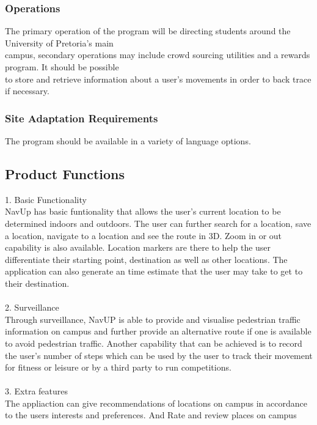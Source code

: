 \documentclass[a4paper,10pt]{article}
\begin{document}
		\subsubsection{Operations}
			The primary operation of the program will be directing students around the University of Pretoria’s main\\				campus, secondary operations may include crowd sourcing utilities and a rewards program. It should be possible\\			to store and retrieve information about a user’s movements in order to back trace if necessary.\\
		\subsubsection{Site Adaptation Requirements}
			The program should be available in a variety of language options.\\
		
		
	\subsection{Product Functions}
		1. Basic Functionality\\
			NavUp has basic funtionality that allows the user's current location to be determined indoors and outdoors. The user can further search for a location, save a location, navigate to a location and see the route in 3D. Zoom in or out capability is also available. Location markers  are there to help the user differentiate their starting point, destination as well as other locations. The application can also generate an time estimate that the user may take to get to their destination.\\
		\\
		2. Surveillance\\
			Through surveillance, NavUP is able to provide and visualise pedestrian traffic information on campus and further provide an alternative route if one is available to avoid pedestrian traffic. Another capability that can be achieved is to record the user's number of steps which can be used by the user to track their movement for fitness or leisure or by a third party to run competitions.\\
		\\
		3. Extra features\\
			The appliaction can give recommendations of locations on campus in accordance to the users interests and preferences. And Rate and review places on campus\\
			
\end{document}

